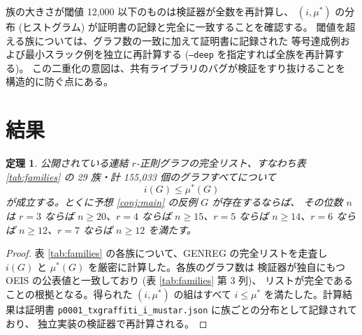 \documentclass[paper=a4,fontsize=10.5pt,jafontsize=10.5pt]{jlreq}
\theoremstyle{plain}
\newtheorem{theorem}{定理}[section]
\theoremstyle{definition}
\begin{document}
族の大きさが閾値 12,000 以下のものは検証器が全数を再計算し、
$(i,\mu^*)$ の分布 (ヒストグラム) が証明書の記録と完全に一致することを確認する。
閾値を超える族については、グラフ数の一致に加えて証明書に記録された
等号達成例および最小スラック例を独立に再計算する
(\texttt{--deep} を指定すれば全族を再計算する)。
この二重化の意図は、共有ライブラリのバグが検証をすり抜けることを
構造的に防ぐ点にある。

\section{結果}

\begin{theorem}\label{thm:main}
公開されている連結 $r$-正則グラフの完全リスト、すなわち表 \ref{tab:families} の
29 族・計 155,033 個のグラフすべてについて
\[ i(G) \le \mu^*(G) \]
が成立する。とくに予想 \ref{conj:main} の反例 $G$ が存在するならば、
その位数 $n$ は $r = 3$ ならば $n \ge 20$、$r = 4$ ならば $n \ge 15$、$r = 5$ ならば $n \ge 14$、$r = 6$ ならば $n \ge 12$、$r = 7$ ならば $n \ge 12$ を満たす。
\end{theorem}

\begin{proof}
表 \ref{tab:families} の各族について、GENREG の完全リストを走査し
$i(G)$ と $\mu^*(G)$ を厳密に計算した。各族のグラフ数は
検証器が独自にもつ OEIS の公表値と一致しており (表 \ref{tab:families} 第 3 列)、
リストが完全であることの根拠となる。得られた $(i,\mu^*)$ の組はすべて
$i \le \mu^*$ を満たした。計算結果は証明書
\texttt{p0001\_txgraffiti\_i\_mustar.json} に族ごとの分布として記録されており、
独立実装の検証器で再計算される。
\end{proof}
\end{document}
